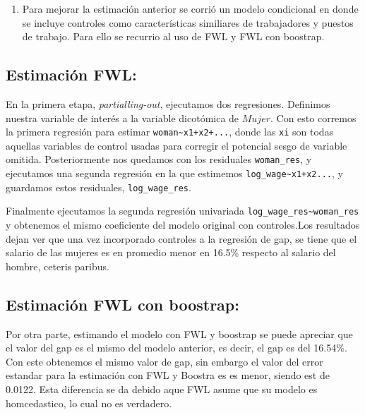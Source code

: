 \documentclass[
  11pt,
  letterpaper,
]{article}
\providecommand{\tightlist}{%
  \setlength{\itemsep}{0pt}\setlength{\parskip}{0pt}}
\begin{document}
\begin{enumerate}
\def\labelenumi{\Alph{enumi})}
\setcounter{enumi}{1}
\tightlist
\item
  Para mejorar la estimación anterior se corrió un modelo condicional en
  donde se incluye controles como características similiares de
  trabajadores y puestos de trabajo. Para ello se recurrio al uso de FWL
  y FWL con boostrap.
\end{enumerate}

\hypertarget{estimaciuxf3n-fwl}{%
\subsection{Estimación FWL:}\label{estimaciuxf3n-fwl}}

En la primera etapa, \emph{partialling-out}, ejecutamos dos regresiones.
Definimos nuestra variable de interés a la variable dicotómica de
\(Mujer\). Con esto corremos la primera regresión para estimar
\texttt{woman\textasciitilde{}x1+x2+...}, donde las \texttt{xi} son
todas aquellas variables de control usadas para corregir el potencial
sesgo de variable omitida. Posteriormente nos quedamos con los
residuales \texttt{woman\_res}, y ejecutamos una segunda regresión en la
que estimemos \texttt{log\_wage\textasciitilde{}x1+x2...}, y guardamos
estos residuales, \texttt{log\_wage\_res}.

Finalmente ejecutamos la segunda regresión univariada
\texttt{log\_wage\_res\textasciitilde{}woman\_res} y obtenemos el mismo
coeficiente del modelo original con controles.Los resultados dejan ver
que una vez incorporado controles a la regresión de gap, se tiene que el
salario de las mujeres es en promedio menor en 16.5\% respecto al
salario del hombre, ceteris paribus.

\hypertarget{estimaciuxf3n-fwl-con-boostrap}{%
\subsection{Estimación FWL con
boostrap:}\label{estimaciuxf3n-fwl-con-boostrap}}

Por otra parte, estimando el modelo con FWL y boostrap se puede apreciar
que el valor del gap es el mismo del modelo anterior, es decir, el gap
es del 16.54\%. Con este obtenemos el mismo valor de gap, sin embargo el
valor del error estandar para la estimación con FWL y Boostra es es
menor, siendo est de 0.0122. Esta diferencia se da debido aque FWL asume
que su modelo es homcedastico, lo cual no es verdadero.
\end{document}
